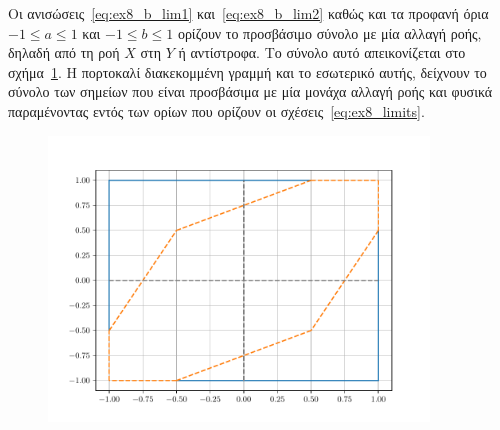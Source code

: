 \begin{solution}
    Οι ανισώσεις~\eqref{eq:ex8_b_lim1} και~\eqref{eq:ex8_b_lim2} καθώς και τα
    προφανή όρια \( -1 \leq a \leq 1 \) και \( -1 \leq b \leq 1 \) ορίζουν το
    προσβάσιμο σύνολο με μία αλλαγή ροής, δηλαδή από τη ροή \( X \) στη \( Y \) ή
    αντίστροφα. Το σύνολο αυτό απεικονίζεται στο σχήμα~\ref{fig:ex8_rhombus1}.
    Η πορτοκαλί διακεκομμένη γραμμή και το εσωτερικό αυτής, δείχνουν το σύνολο των σημείων
    που είναι προσβάσιμα με μία μονάχα αλλαγή ροής και φυσικά παραμένοντας εντός
    των ορίων που ορίζουν οι σχέσεις~\eqref{eq:ex8_limits}.
    \begin{figure}[h]
        \centering
        \includegraphics[width=0.9\textwidth]{figures/ex8_rhombus1.pdf}
        \caption{}
        \label{fig:ex8_rhombus1}
    \end{figure}


\end{solution}
